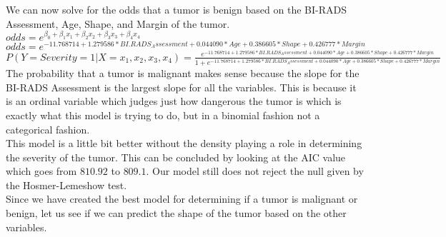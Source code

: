 \documentclass{article}
\begin{document}
We can now solve for the odds that a tumor is benign based on the BI-RADS Assessment, Age, Shape, and Margin of the tumor.\hfill \\

$odds = e^{\beta_{0}+\beta_{1}x_{1}+\beta_{2}x_{2}+\beta_{3}x_{3}+\beta_{4}x_{4}}$\\
$odds = e^{-11.768714 + 1.279586*BI.RADS_Assessment + 0.044090*Age + 0.386605*Shape + 0.426777*Margin}$ \\

$P(Y=Severity=1|X=x_{1},x_{2},x_{3},x_{4}) = \frac{e^{-11.768714 + 1.279586*BI.RADS_Assessment + 0.044090*Age + 0.386605*Shape + 0.426777*Margin}}{1+e^{-11.768714 + 1.279586*BI.RADS_Assessment + 0.044090*Age + 0.386605*Shape + 0.426777*Margin}}$ \\

The probability that a tumor is malignant makes sense because the slope for the BI-RADS Assessment is the largest slope for all the variables. This is because it is an ordinal variable which judges just how dangerous the tumor is which is exactly what this model is trying to do, but in a binomial fashion not a categorical fashion. \\

This model is a little bit better without the density playing a role in determining the severity of the tumor. This can be concluded by looking at the AIC value which goes from $810.92$ to $809.1$. Our model still does not reject the null given by the Hosmer-Lemeshow test. \\ 

Since we have created the best model for determining if a tumor is malignant or benign, let us see if we can predict the shape of the tumor based on the other variables. \\
\end{document}
